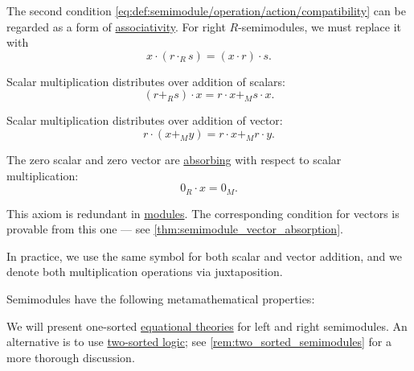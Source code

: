 \begin{definition}
\begin{thmenum}[series=def:semimodule]
\begin{thmenum}
      The second condition \eqref{eq:def:semimodule/operation/action/compatibility} can be regarded as a form of \hyperref[def:binary_operation/associative]{associativity}. For right \( R \)-semimodules, we must replace it with
      \begin{equation}\label{eq:def:semimodule/operation/action/compatibility_right}
        x \cdot (r \cdot_R s) = (x \cdot r) \cdot s.
      \end{equation}

       Scalar multiplication distributes over addition  of scalars:
      \begin{equation}\label{eq:def:semimodule/operation/scalar_addition_distributivity}
        (r +_R s) \cdot x = r \cdot x +_M s \cdot x.
      \end{equation}

       Scalar multiplication distributes over addition of vector:
      \begin{equation}\label{eq:def:semimodule/operation/vector_addition_distributivity}
        r \cdot (x +_M y) = r \cdot x +_M r \cdot y.
      \end{equation}

       The zero scalar and zero vector are \hyperref[def:semigroup_absorbing_element]{absorbing} with respect to scalar multiplication:
      \begin{equation}\label{eq:def:semimodule/operation/absorption}
        0_R \cdot x = 0_M.
      \end{equation}

      This axiom is redundant in \hyperref[def:module]{modules}. The corresponding condition for vectors is provable from this one --- see \cref{thm:semimodule_vector_absorption}.
    \end{thmenum}

    In practice, we use the same symbol for both scalar and vector addition, and we denote both multiplication operations via juxtaposition.
  \end{thmenum}

  Semimodules have the following metamathematical properties:
  \begin{thmenum}[resume=def:semimodule]
    \mimprovised We will present one-sorted \hyperref[def:fol_equational_theory]{equational theories} for left and right semimodules. An alternative is to use \hyperref[def:many_sorted_fol]{two-sorted logic}; see \cref{rem:two_sorted_semimodules} for a more thorough discussion.


\end{thmenum}
\end{definition}
